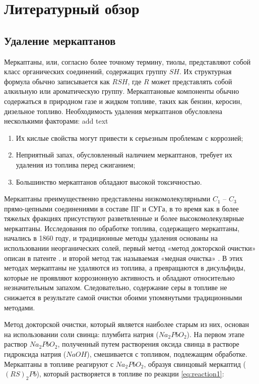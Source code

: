 \chapter{Литературный обзор} \label{ch:ch1}

\section{Удаление меркаптанов} \label{sec:ch1/sec1}

Меркаптаны, или, согласно более точному термину, тиолы, представляют собой класс органических соединений, содержащих группу $SH$. Их структурная формула обычно записывается как $RSH$, где $R$ может представлять собой алкильную или ароматическую группу. Меркаптановые компоненты обычно содержаться в природном газе и жидком топливе, таких как бензин, керосин, дизельное топливо. Необходимость удаления меркаптанов обусловлена несколькими факторами: add text

\begin{enumerate}
	\item Их кислые свойства могут привести к серьезным проблемам с коррозией;
	\item Неприятный запах, обусловленный наличием меркаптанов, требует их удаления из топлива перед сжиганием;
	\item Большинство меркаптанов обладают высокой токсичностью.
\end{enumerate}

Меркаптаны преимущественно представлены низкомолекулярными $C _1$ – $C _3$ прямо-цепными соединениями в составе ПГ и СУГа, в то время как в более тяжелых фракциях присутствуют разветвленные и более высокомолекулярные меркаптаны. Исследования по обработке топлива, содержащего меркаптаны, начались в 1860 году, и традиционные методы удаления основаны на использовании неорганических солей, первый метод «метод докторской очистки» описан в патенте \cite{kalinowski_doctor_1959}. и второй метод так называемая «медная очистка» \cite{krause_color_1952}. В этих методах меркаптаны не удаляются из топлива, а превращаются в дисульфиды, которые не проявляют коррозионную активность и обладают относительно незначительным запахом. Следовательно, содержание серы в топливе не снижается в результате самой очистки обоими упомянутыми традиционными методами.

Метод докторской очистки, который является наиболее старым из них, основан на использовании соли свинца: плумбита натрия ($Na_2PbO_2$). На первом этапе раствор $Na_2PbO_2$, полученный путем растворения оксида свинца в растворе гидроксида натрия ($NaOH$), смешивается с топливом, подлежащим обработке. Меркаптаны в топливе реагируют с $Na_2PbO_2$, образуя свинцовый меркаптид ($(RS)_2Pb$), который растворяется в топливе по реакции \cref{eq:reaction1}:

